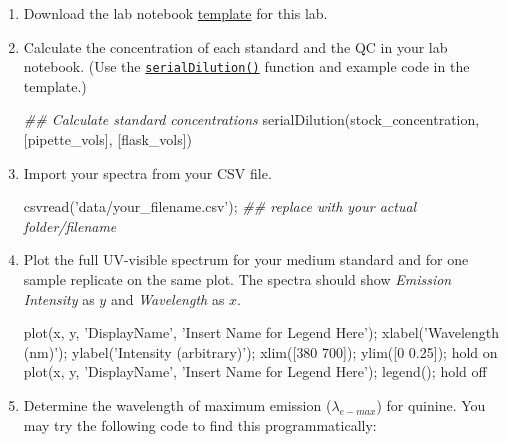 \documentclass[]{tufte-book}
\newenvironment{Shaded}{}{}
\newcommand{\CommentTok}[1]{\textcolor[rgb]{0.38,0.63,0.69}{\textit{#1}}}
\newcommand{\FloatTok}[1]{\textcolor[rgb]{0.25,0.63,0.44}{#1}}
\newcommand{\FunctionTok}[1]{\textcolor[rgb]{0.02,0.16,0.49}{#1}}
\newcommand{\NormalTok}[1]{#1}
\newcommand{\OperatorTok}[1]{\textcolor[rgb]{0.40,0.40,0.40}{#1}}
\newcommand{\StringTok}[1]{\textcolor[rgb]{0.25,0.44,0.63}{#1}}
\begin{document}
\begin{enumerate}
\def\labelenumi{\arabic{enumi}.}
\item
  Download the lab notebook \href{../notebooks/}{template} for this lab.\\
\item
  Calculate the concentration of each standard and the QC in your lab notebook. (Use the \href{serial-dilution.html}{\texttt{serialDilution()}} function and example code in the template.)

\begin{Shaded}
\begin{Highlighting}[]
\CommentTok{## Calculate standard concentrations}
\NormalTok{serialDilution(stock_concentration}\OperatorTok{,}\NormalTok{ [pipette_vols]}\OperatorTok{,}\NormalTok{ [flask_vols])}
\end{Highlighting}
\end{Shaded}
\item
  Import your spectra from your CSV file.

\begin{Shaded}
\begin{Highlighting}[]
\FunctionTok{csvread}\NormalTok{(}\StringTok{'data/your_filename.csv'}\NormalTok{)}\OperatorTok{;}  \CommentTok{## replace with your actual folder/filename}
\end{Highlighting}
\end{Shaded}
\item
  Plot the full UV-visible spectrum for your medium standard and for one sample replicate on the same plot. The spectra should show \emph{Emission Intensity} as \(y\) and \emph{Wavelength} as \(x\).

\begin{Shaded}
\begin{Highlighting}[]
\FunctionTok{plot}\NormalTok{(x}\OperatorTok{,}\NormalTok{ y}\OperatorTok{,} \StringTok{'DisplayName'}\OperatorTok{,} \StringTok{'Insert Name for Legend Here'}\NormalTok{)}\OperatorTok{;}
\FunctionTok{xlabel}\NormalTok{(}\StringTok{'Wavelength (nm)'}\NormalTok{)}\OperatorTok{;}
\FunctionTok{ylabel}\NormalTok{(}\StringTok{'Intensity (arbitrary)'}\NormalTok{)}\OperatorTok{;}
\FunctionTok{xlim}\NormalTok{([}\FloatTok{380} \FloatTok{700}\NormalTok{])}\OperatorTok{;} \FunctionTok{ylim}\NormalTok{([}\FloatTok{0} \FloatTok{0.25}\NormalTok{])}\OperatorTok{;}
\FunctionTok{hold}\NormalTok{ on}
\FunctionTok{plot}\NormalTok{(x}\OperatorTok{,}\NormalTok{ y}\OperatorTok{,} \StringTok{'DisplayName'}\OperatorTok{,} \StringTok{'Insert Name for Legend Here'}\NormalTok{)}\OperatorTok{;}
\FunctionTok{legend}\NormalTok{()}\OperatorTok{;}
\FunctionTok{hold}\NormalTok{ off}
\end{Highlighting}
\end{Shaded}
\item
  Determine the wavelength of maximum emission (\(\lambda_{e-max}\)) for quinine. You may try the following code to find this programmatically:


\end{enumerate}
\end{document}

